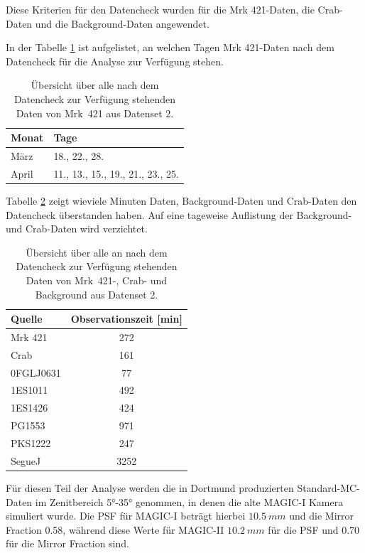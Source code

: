 Diese Kriterien für den Datencheck wurden für die Mrk 421-Daten, die Crab-Daten und die Background-Daten angewendet.

In der Tabelle \ref{tab:Datenset2-Mrk421} ist aufgelistet, an welchen Tagen Mrk 421-Daten nach dem Datencheck für die Analyse zur Verfügung stehen.


\begin{table}[!h]
\centering
\caption{Übersicht über alle nach dem Datencheck zur Verfügung stehenden Daten von Mrk~421 aus Datenset 2.}
\label{tab:Datenset2-Mrk421}
\begin{tabular}{ll}
  \toprule
  Monat & Tage\\
  \midrule
  \midrule
März & 18., 22., 28.\\
April & 11., 13., 15., 19., 21., 23., 25. \\
  \bottomrule
\end{tabular}
\end{table}

Tabelle \ref{tab:Datenset2} zeigt wieviele Minuten Daten, Background-Daten und Crab-Daten den Datencheck überstanden haben. 
Auf eine tageweise Auflistung der Background- und Crab-Daten wird verzichtet.

\begin{table}[!h]
\centering
\caption{Übersicht über alle an nach dem Datencheck zur Verfügung stehenden Daten von Mrk~421-, Crab- und Background aus Datenset 2.}
\label{tab:Datenset2}
\begin{tabular}{lc}
  \toprule
  Quelle & Observationszeit [min]\\
  \midrule
  \midrule
  Mrk 421 & 272\\
  \midrule
  Crab & 161\\
  \midrule
  0FGLJ0631 & 77 \\
  1ES1011 & 492 \\
  1ES1426 & 424 \\
  PG1553 & 971 \\
  PKS1222 & 247 \\
  SegueJ & 3252 \\
  \bottomrule
\end{tabular}
\end{table}

Für diesen Teil der Analyse werden die in Dortmund produzierten Standard-MC-Daten im Zenitbereich 5°-35° genommen, in denen die alte MAGIC-I Kamera simuliert wurde.
Die PSF für MAGIC-I beträgt hierbei $\SI{10,5}{mm}$ und die Mirror Fraction 0.58, während diese Werte für MAGIC-II $\SI{10,2}{mm}$ für die PSF und 0.70 für die Mirror Fraction sind.

